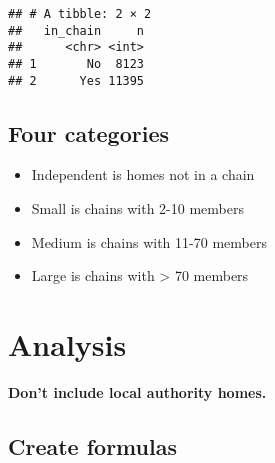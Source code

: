 \documentclass[]{article}
\newenvironment{Shaded}{\begin{snugshade}}{\end{snugshade}}
\newcommand{\KeywordTok}[1]{\textcolor[rgb]{0.13,0.29,0.53}{\textbf{{#1}}}}
\newcommand{\DataTypeTok}[1]{\textcolor[rgb]{0.13,0.29,0.53}{{#1}}}
\newcommand{\DecValTok}[1]{\textcolor[rgb]{0.00,0.00,0.81}{{#1}}}
\newcommand{\StringTok}[1]{\textcolor[rgb]{0.31,0.60,0.02}{{#1}}}
\newcommand{\NormalTok}[1]{{#1}}
\providecommand{\tightlist}{%
  \setlength{\itemsep}{0pt}\setlength{\parskip}{0pt}}
\begin{document}
\begin{verbatim}
## # A tibble: 2 × 2
##   in_chain     n
##      <chr> <int>
## 1       No  8123
## 2      Yes 11395
\end{verbatim}

\subsection{Four categories}\label{four-categories}

\begin{itemize}
\tightlist
\item
  Independent is homes not in a chain
\item
  Small is chains with 2-10 members
\item
  Medium is chains with 11-70 members
\item
  Large is chains with \textgreater{} 70 members
\end{itemize}

\begin{Shaded}
\end{Shaded}

\section{Analysis}\label{analysis}

\textbf{Don't include local authority homes.}

\begin{Shaded}
\end{Shaded}

\subsection{Create formulas}\label{create-formulas}
\end{document}
